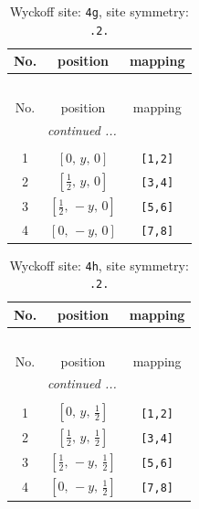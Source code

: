 \documentclass[fleqn,8pt]{jsarticle}
\begin{document}
\begin{longtable}{ccc}
\caption{Wyckoff site: {\tt 4g}, site symmetry: {\tt .2.}}
 \\
 \hline \hline
No. & position & mapping \\ \hline \endfirsthead

\multicolumn{2}{l}{\tablename\ \thetable{}} \\
 \hline \hline
No. & position & mapping \\ \hline \endhead

 \hline \hline
\multicolumn{2}{r}{\footnotesize\it continued ...} \\ \endfoot

 \hline \hline
\multicolumn{2}{r}{} \\ \endlastfoot

1 & $\left[ 0,\, y,\, 0 \right]$ & {\tt [1,2]} \\ \hline
2 & $\left[ \frac{1}{2},\, y,\, 0 \right]$ & {\tt [3,4]} \\ \hline
3 & $\left[ \frac{1}{2},\, - y,\, 0 \right]$ & {\tt [5,6]} \\ \hline
4 & $\left[ 0,\, - y,\, 0 \right]$ & {\tt [7,8]} \\
\end{longtable}
\renewcommand{\arraystretch}{1.2}
\begin{longtable}{ccc}
\caption{Wyckoff site: {\tt 4h}, site symmetry: {\tt .2.}}
 \\
 \hline \hline
No. & position & mapping \\ \hline \endfirsthead

\multicolumn{2}{l}{\tablename\ \thetable{}} \\
 \hline \hline
No. & position & mapping \\ \hline \endhead

 \hline \hline
\multicolumn{2}{r}{\footnotesize\it continued ...} \\ \endfoot

 \hline \hline
\multicolumn{2}{r}{} \\ \endlastfoot

1 & $\left[ 0,\, y,\, \frac{1}{2} \right]$ & {\tt [1,2]} \\ \hline
2 & $\left[ \frac{1}{2},\, y,\, \frac{1}{2} \right]$ & {\tt [3,4]} \\ \hline
3 & $\left[ \frac{1}{2},\, - y,\, \frac{1}{2} \right]$ & {\tt [5,6]} \\ \hline
4 & $\left[ 0,\, - y,\, \frac{1}{2} \right]$ & {\tt [7,8]} \\
\end{longtable}
\end{document}
